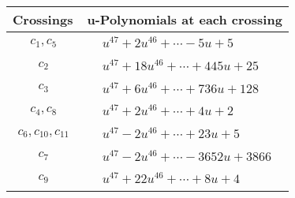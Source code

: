 \documentclass[1p]{elsarticle_modified}
\theoremstyle{definition}
\begin{document}
\begin{tabular}{m{50pt}|m{274pt}}
Crossings & \hspace{64pt}u-Polynomials at each crossing \\
\hline $$\begin{aligned}c_{1},c_{5}\end{aligned}$$&$\begin{aligned}
&u^{47}+2 u^{46}+\cdots-5 u+5
\end{aligned}$\\
\hline $$\begin{aligned}c_{2}\end{aligned}$$&$\begin{aligned}
&u^{47}+18 u^{46}+\cdots+445 u+25
\end{aligned}$\\
\hline $$\begin{aligned}c_{3}\end{aligned}$$&$\begin{aligned}
&u^{47}+6 u^{46}+\cdots+736 u+128
\end{aligned}$\\
\hline $$\begin{aligned}c_{4},c_{8}\end{aligned}$$&$\begin{aligned}
&u^{47}+2 u^{46}+\cdots+4 u+2
\end{aligned}$\\
\hline $$\begin{aligned}c_{6},c_{10},c_{11}\end{aligned}$$&$\begin{aligned}
&u^{47}-2 u^{46}+\cdots+23 u+5
\end{aligned}$\\
\hline $$\begin{aligned}c_{7}\end{aligned}$$&$\begin{aligned}
&u^{47}-2 u^{46}+\cdots-3652 u+3866
\end{aligned}$\\
\hline $$\begin{aligned}c_{9}\end{aligned}$$&$\begin{aligned}
&u^{47}+22 u^{46}+\cdots+8 u+4
\end{aligned}$\\
\hline
\end{tabular}\\~\\
\newpage\renewcommand{\arraystretch}{1}
\end{document}

